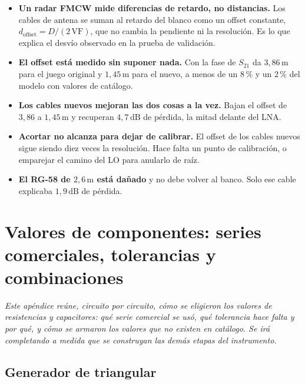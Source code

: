 \documentclass[12pt, a4paper, twoside]{report}
\begin{document}
\begin{itemize}
  \item \textbf{Un radar FMCW mide diferencias de retardo, no
    distancias.} Los cables de antena se suman al retardo del blanco
    como un offset constante, $d_\text{offset} = D/(2\,\text{VF})$,
    que no cambia la pendiente ni la resolución. Es lo que explica el
    desvío observado en la prueba de validación.
  \item \textbf{El offset está medido sin suponer nada.} Con la fase
    de $S_{21}$ da $3{,}86\,\text{m}$ para el juego original y
    $1{,}45\,\text{m}$ para el nuevo, a menos de un $8$\,\% y un
    $2$\,\% del modelo con valores de catálogo.
  \item \textbf{Los cables nuevos mejoran las dos cosas a la vez.}
    Bajan el offset de $3{,}86$ a $1{,}45\,\text{m}$ y recuperan
    $4{,}7\,\text{dB}$ de pérdida, la mitad delante del LNA.
  \item \textbf{Acortar no alcanza para dejar de calibrar.} El offset
    de los cables nuevos sigue siendo diez veces la resolución. Hace
    falta un punto de calibración, o emparejar el camino del LO para
    anularlo de raíz.
  \item \textbf{El RG-58 de $2{,}6\,\text{m}$ está dañado} y no debe
    volver al banco. Solo ese cable explicaba $1{,}9\,\text{dB}$ de
    pérdida.
\end{itemize}



\appendix

\chapter{Valores de componentes: series comerciales, tolerancias
  y combinaciones}
\label{ap:valores}

\textit{Este apéndice reúne, circuito por circuito, cómo se eligieron los
valores de resistencias y capacitores: qué serie comercial se usó, qué
tolerancia hace falta y por qué, y cómo se armaron los valores que no
existen en catálogo. Se irá completando a medida que se construyan las
demás etapas del instrumento.}

\section{Generador de triangular}
\label{sec:val_triangular}
\end{document}

